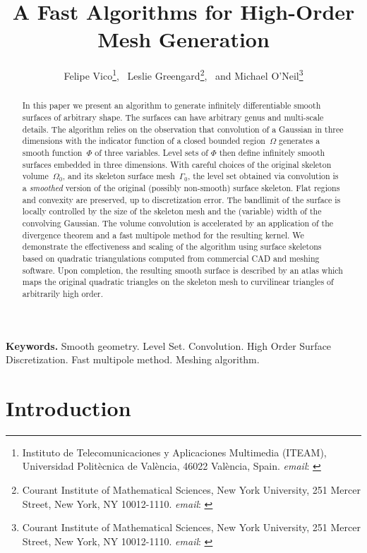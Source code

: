 \documentclass[11pt, oneside]{article}
\title{\bf\sffamily A Fast Algorithms for High-Order Mesh Generation}
\author{Felipe Vico\thanks{Instituto de Telecomunicaciones y Aplicaciones Multimedia (ITEAM), 
Universidad Polit\` ecnica
de Val\` encia, 46022 Val\` encia, Spain. {{\em email}: {\sf {felipe.vico@gmail.com,
}}} }, \,
Leslie Greengard\thanks{Courant Institute of Mathematical Sciences,
         New York University, 
         251 Mercer Street,
         New York, NY 10012-1110.
{{\em email}: {\sf {greengard@cims.nyu.edu.}}}}, \, 
and Michael O'Neil\thanks{Courant Institute of Mathematical Sciences,
         New York University, 
         251 Mercer Street,
         New York, NY 10012-1110.
{{\em email}: {\sf {oneil@cims.nyu.edu.}}}}
}
\begin{document}
\maketitle

%



\begin{abstract}
In this paper we present an algorithm to generate infinitely differentiable
smooth surfaces of arbitrary shape. The surfaces can have arbitrary genus and 
multi-scale details.
The algorithm relies on the observation that convolution of a Gaussian in three
dimensions with the indicator function of a closed bounded region~$\Omega$ generates
a smooth function~$\Phi$ of three variables. Level sets of $\Phi$ then define infinitely
smooth surfaces embedded in three dimensions.
With careful choices of the original skeleton volume~$\Omega_0$, and its skeleton 
surface mesh~$\Gamma_0$, the level set obtained via convolution is a \emph{smoothed}
version of the original (possibly non-smooth) surface skeleton.
Flat regions and convexity are preserved, up to discretization error. 
The bandlimit of the surface is locally controlled by 
the size of the skeleton mesh and the (variable) width of the convolving Gaussian.
The volume convolution is accelerated by an application of the divergence theorem and
a fast multipole method for the resulting kernel.
We demonstrate the effectiveness and scaling of the algorithm using surface 
skeletons based on quadratic triangulations computed from commercial CAD and meshing software.
Upon completion, the resulting smooth surface is described by an atlas which maps the original 
quadratic triangles on the skeleton mesh to curvilinear triangles of arbitrarily high order.
\end{abstract}

{\bf Keywords.} Smooth geometry. Level Set. Convolution. High Order Surface Discretization.
Fast multipole method. Meshing algorithm.



\section{Introduction}
\end{document}
